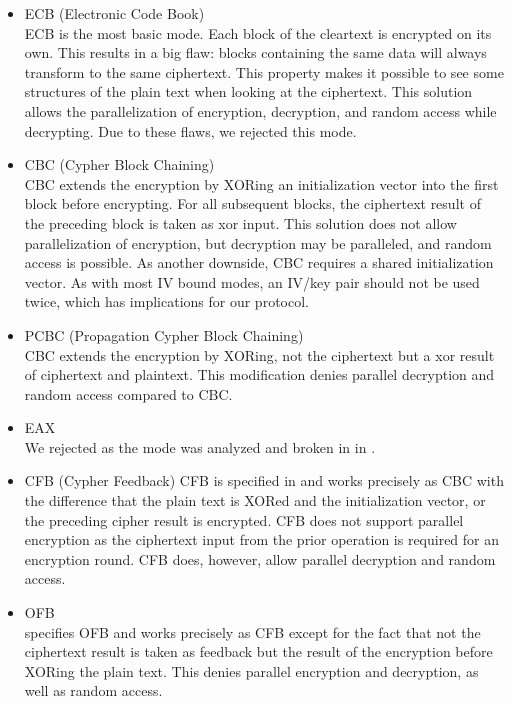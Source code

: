 \begin{itemize}
	\item ECB (Electronic Code Book)\\
	ECB is the most basic mode. Each block of the cleartext is encrypted on its own. This results in a big flaw: blocks containing the same data will always transform to the same ciphertext. This property makes it possible to see some structures of the plain text when looking at the ciphertext. This solution allows the parallelization of encryption, decryption, and random access while decrypting. Due to these flaws, we rejected this mode.
	\item CBC (Cypher Block Chaining)\\  
	CBC extends the encryption by XORing an initialization vector into the first block before encrypting. For all subsequent blocks, the ciphertext result of the preceding block is taken as xor input. This solution does not allow parallelization of encryption, but decryption may be paralleled, and random access is possible. As another downside, CBC requires a shared initialization vector. As with most IV bound modes, an IV/key pair should not be used twice, which has implications for our protocol.
	\item PCBC (Propagation Cypher Block Chaining)\\
	CBC extends the encryption by XORing, not the ciphertext but a xor result of ciphertext and plaintext. This modification denies parallel decryption and random access compared to CBC.
	\item EAX\\      
	We rejected as the mode was analyzed and broken in \citeyear{minematsu2013attacks} in \cite{minematsu2013attacks}.
	\item CFB (Cypher Feedback)
	CFB is specified in \cite{dworkin2001recommendation} and works precisely as CBC with the difference that the plain text is XORed and the initialization vector, or the preceding cipher result is encrypted. CFB does not support parallel encryption as the ciphertext input from the prior operation is required for an encryption round. CFB does, however, allow parallel decryption and random access.
	\item OFB\\
	\cite{dworkin2001recommendation} specifies OFB and works precisely as CFB except for the fact that not the ciphertext result is taken as feedback but the result of the encryption before XORing the plain text. This denies parallel encryption and decryption, as well as random access.

\end{itemize}
